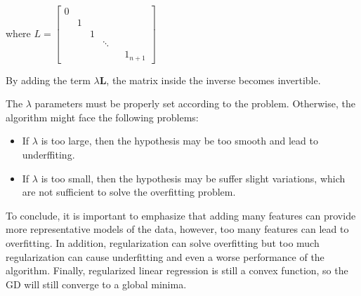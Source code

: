 \documentclass[a4paper, report, oneside, UKenglish]{memoir}
\begin{document}
where $L = \begin{bmatrix} 
    0 &  & & & &\\
     & 1 & & & &\\
     &  & 1 & & & \\
     &  & & \ddots & &\\
     & & & & &  1_{n+1} 
    \end{bmatrix}$
    
By adding the term $\lambda \textbf{L}$, the matrix inside the inverse becomes invertible.

The $\lambda$ parameters must be properly set according to the problem. Otherwise, the algorithm might face the following problems:

\begin{itemize}
    \item If $\lambda$ is too large, then the hypothesis may be too smooth and lead to underffiting.
    \item If $\lambda$ is too small, then the hypothesis may be suffer slight variations, which are not sufficient to solve the overfitting problem.
\end{itemize}

To conclude, it is important to emphasize that adding many features can provide more representative models of the data, however, too many features can lead to overfitting. In addition, regularization can solve overfitting but too much regularization can cause underfitting and even a worse performance of the algorithm. Finally, regularized linear regression is still a convex function, so the GD will still converge to a global minima. 


\end{document}
